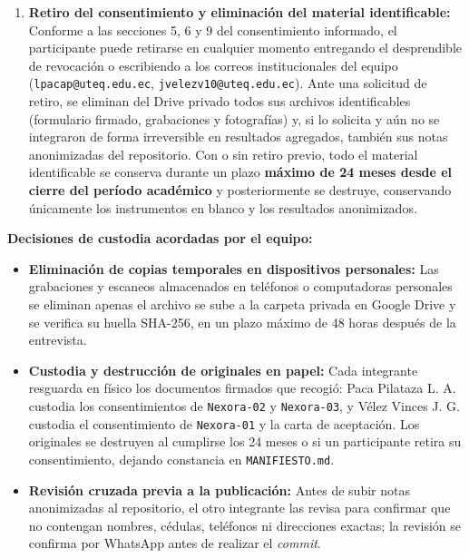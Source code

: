 \documentclass[11pt,a4paper]{article}
\begin{document}
\begin{enumerate}[label=\textbf{\arabic*.}, leftmargin=1.8em, itemsep=3pt, topsep=3pt]
    \item \textbf{Retiro del consentimiento y eliminaci\'on del material identificable:} Conforme a las secciones 5, 6 y 9 del consentimiento informado, el participante puede retirarse en cualquier momento entregando el desprendible de revocaci\'on o escribiendo a los correos institucionales del equipo (\texttt{lpacap@uteq.edu.ec}, \texttt{jvelezv10@uteq.edu.ec}). Ante una solicitud de retiro, se eliminan del Drive privado todos sus archivos identificables (formulario firmado, grabaciones y fotograf\'ias) y, si lo solicita y a\'un no se integraron de forma irreversible en resultados agregados, tambi\'en sus notas anonimizadas del repositorio. Con o sin retiro previo, todo el material identificable se conserva durante un plazo \textbf{m\'aximo de 24 meses desde el cierre del per\'iodo acad\'emico} y posteriormente se destruye, conservando \'unicamente los instrumentos en blanco y los resultados anonimizados.
\end{enumerate}

\textbf{Decisiones de custodia acordadas por el equipo:}
\begin{itemize}[leftmargin=1.5em, itemsep=2pt, topsep=2pt]
    \item \textbf{Eliminaci\'on de copias temporales en dispositivos personales:} Las grabaciones y escaneos almacenados en tel\'efonos o computadoras personales se eliminan apenas el archivo se sube a la carpeta privada en Google Drive y se verifica su huella SHA-256, en un plazo m\'aximo de 48 horas despu\'es de la entrevista.
    \item \textbf{Custodia y destrucci\'on de originales en papel:} Cada integrante resguarda en f\'isico los documentos firmados que recogi\'o: Paca Pilataza L. A. custodia los consentimientos de \texttt{Nexora-02} y \texttt{Nexora-03}, y V\'elez Vinces J. G. custodia el consentimiento de \texttt{Nexora-01} y la carta de aceptaci\'on. Los originales se destruyen al cumplirse los 24 meses o si un participante retira su consentimiento, dejando constancia en \texttt{MANIFIESTO.md}.
    \item \textbf{Revisi\'on cruzada previa a la publicaci\'on:} Antes de subir notas anonimizadas al repositorio, el otro integrante las revisa para confirmar que no contengan nombres, c\'edulas, tel\'efonos ni direcciones exactas; la revisi\'on se confirma por WhatsApp antes de realizar el \textit{commit}.
\end{itemize}

\end{document}

